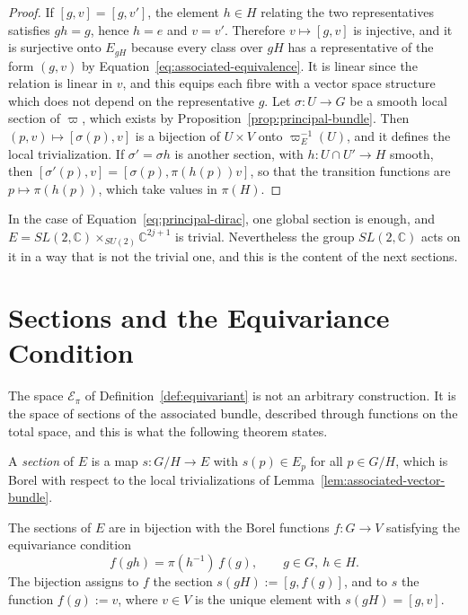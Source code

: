 	\begin{proof}
		If $[g,v]=[g,v']$, the element $h\in H$ relating the two representatives satisfies $gh=g$, hence $h=e$ and $v=v'$. Therefore $v\mapsto[g,v]$ is injective, and it is surjective onto $E_{gH}$ because every class over $gH$ has a representative of the form $(g,v)$ by Equation~\eqref{eq:associated-equivalence}. It is linear since the relation is linear in $v$, and this equips each fibre with a vector space structure which does not depend on the representative $g$. Let $\sigma:U\to G$ be a smooth local section of $\varpi$, which exists by Proposition~\ref{prop:principal-bundle}. Then $(p,v)\mapsto[\sigma(p),v]$ is a bijection of $U\times V$ onto $\varpi_E^{-1}(U)$, and it defines the local trivialization. If $\sigma'=\sigma h$ is another section, with $h:U\cap U'\to H$ smooth, then $[\sigma'(p),v]=[\sigma(p),\pi(h(p))v]$, so that the transition functions are $p\mapsto\pi(h(p))$, which take values in $\pi(H)$.
	\end{proof}
	
	\noindent In the case of Equation~\eqref{eq:principal-dirac}, one global section is enough, and $E=SL(2,\mathbb{C})\times_{SU(2)}\mathbb{C}^{2j+1}$ is trivial. Nevertheless the group $SL(2,\mathbb{C})$ acts on it in a way that is not the trivial one, and this is the content of the next sections.
	
	\section{Sections and the Equivariance Condition}
	\label{sec:sections-equivariance}
	
	The space $\mathcal{E}_\pi$ of Definition~\ref{def:equivariant} is not an arbitrary construction. It is the space of sections of the associated bundle, described through functions on the total space, and this is what the following theorem states.
	
	\begin{definition}\label{def:sections}
		A \emph{section} of $E$ is a map $s:G/H\to E$ with $s(p)\in E_p$ for all $p\in G/H$, which is Borel with respect to the local trivializations of Lemma~\ref{lem:associated-vector-bundle}.
	\end{definition}
	
	\begin{theorem}\label{thm:equivariant-sections}
		The sections of $E$ are in bijection with the Borel functions $f:G\to V$ satisfying the equivariance condition
		\begin{equation}\label{eq:equivariance-condition}
			f(gh)=\pi(h^{-1})\,f(g),\qquad g\in G,\ h\in H.
		\end{equation}
		The bijection assigns to $f$ the section $s(gH):=[g,f(g)]$, and to $s$ the function $f(g):=v$, where $v\in V$ is the unique element with $s(gH)=[g,v]$.
	\end{theorem}
	
